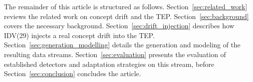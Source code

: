 %
The remainder of this article is structured as follows. Section~\ref{sec:related_work} reviews the related work on concept drift and the TEP. Section~\ref{sec:background} covers the necessary background. Section~\ref{sec:drift_injection} describes how IDV(29) injects a real concept drift into the TEP. Section~\ref{sec:generation_modelling} details the generation and modeling of the resulting data streams. Section~\ref{sec:evaluation} presents the evaluation of established detectors and adaptation strategies on this stream, before Section~\ref{sec:conclusion} concludes the article. \par

